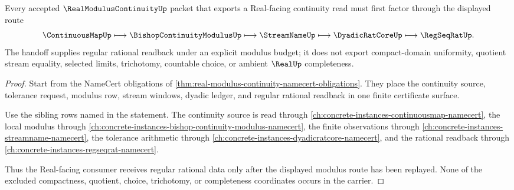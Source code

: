 \begin{theorem}
\label{thm:real-modulus-continuity-regseqrat-handoff}
Every accepted $\RealModulusContinuityUp$ packet that exports a Real-facing continuity read must first factor through the displayed route
$$
\ContinuousMapUp \longmapsto \BishopContinuityModulusUp \longmapsto \StreamNameUp \longmapsto \DyadicRatCoreUp \longmapsto \RegSeqRatUp .
$$
The handoff supplies regular rational readback under an explicit modulus budget; it does not export compact-domain uniformity, quotient stream equality, selected limits, trichotomy, countable choice, or ambient $\RealUp$ completeness.
\end{theorem}
\begin{proof}
Start from the NameCert obligations of \autoref{thm:real-modulus-continuity-namecert-obligations}. They place the continuity source, tolerance request, modulus row, stream windows, dyadic ledger, and regular rational readback in one finite certificate surface.

Use the sibling rows named in the statement. The continuity source is read through \autoref{ch:concrete-instances-continuousmap-namecert}, the local modulus through \autoref{ch:concrete-instances-bishop-continuity-modulus-namecert}, the finite observations through \autoref{ch:concrete-instances-streamname-namecert}, the tolerance arithmetic through \autoref{ch:concrete-instances-dyadicratcore-namecert}, and the rational readback through \autoref{ch:concrete-instances-regseqrat-namecert}.

Thus the Real-facing consumer receives regular rational data only after the displayed modulus route has been replayed. None of the excluded compactness, quotient, choice, trichotomy, or completeness coordinates occurs in the carrier.
\end{proof}

